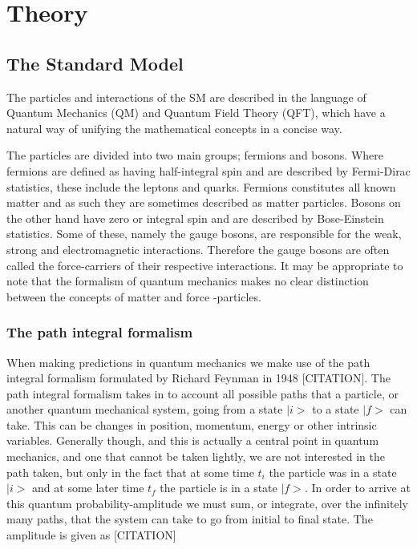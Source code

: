\section{Theory}
\subsection{The Standard Model}
The particles and interactions of the SM are described in the language of Quantum Mechanics (QM) and Quantum Field Theory (QFT), which have a natural way of unifying the mathematical concepts in a concise way.

The particles are divided into two main groups; fermions and bosons. Where fermions are defined as having half-integral spin and are described by Fermi-Dirac statistics, these include the leptons and quarks. Fermions constitutes all known matter and as such they are sometimes described as matter particles. Bosons on the other hand have zero or integral spin and are described by Bose-Einstein statistics. Some of these, namely the gauge bosons, are responsible for the weak, strong and electromagnetic interactions. Therefore the gauge bosons are often called the force-carriers of their respective interactions. It may be appropriate to note that the formalism of quantum mechanics makes no clear distinction between the concepts of matter and force -particles.


\subsubsection{The path integral formalism}
When making predictions in quantum mechanics we make use of the path integral formalism formulated by Richard Feynman in 1948 [CITATION]. The path integral formalism takes in to account all possible paths that a particle, or another quantum mechanical system, going from a state $|i>$ to a state $|f>$ can take. This can be changes in position, momentum, energy or other intrinsic variables. Generally though, and this is actually a central point in quantum mechanics, and one that cannot be taken lightly, we are not interested in the path taken, but only in the fact that at some time $t_{i}$ the particle was in a state $|i>$ and at some later time $t_{f}$ the particle is in a state $|f>$. In order to arrive at this quantum probability-amplitude we must sum, or integrate, over  the infinitely many paths, that the system can take to go from  initial to final state. The amplitude is given as [CITATION]

